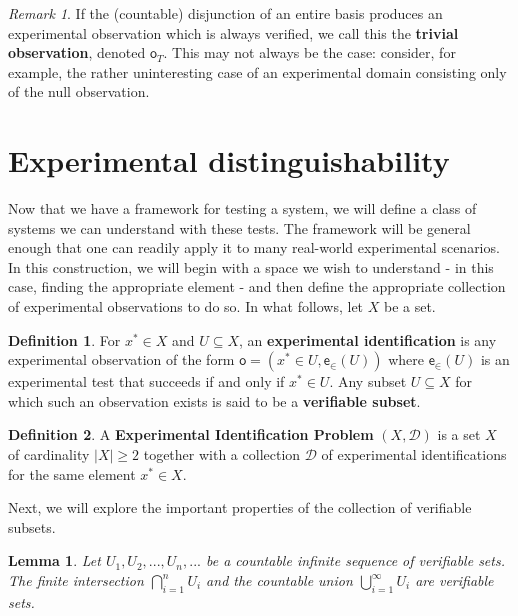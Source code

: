 \documentclass[review]{elsarticle}
\theoremstyle{plain}%
\newtheorem{lem}[thm]{Lemma}
\theoremstyle{definition}
\newtheorem{defn}{Definition}[section]
\theoremstyle{remark}
\newtheorem*{rem}{Remark}
\begin{document}
\begin{rem}
If the (countable) disjunction of an entire basis produces an experimental observation which is always verified, we call this the \textbf{trivial observation}, denoted $\mathsf{o}_T$. This may not always be the case: consider, for example, the rather uninteresting case of an experimental domain consisting only of the null observation. 
\end{rem}




\section{Experimental distinguishability}

Now that we have a framework for testing a system, we will define a class of systems we can understand with these tests. The framework will be general enough that one can readily apply it to many real-world experimental scenarios. In this construction, we will begin with a space we wish to understand - in this case, finding the appropriate element - and then define the appropriate collection of experimental observations to do so. In what follows, let $X$ be a set. 

\begin{defn}
For $x^*\in X$ and $U\subseteq X$, an \textbf{experimental identification} is any experimental observation of the form $\mathsf{o} = (x^*\in U, \mathsf{e}_\in(U))$ where $\mathsf{e}_\in(U)$ is an experimental test that succeeds if and only if $x^*\in U$. Any subset $U\subseteq X$ for which such an observation exists is said to be a \textbf{verifiable subset}. 
\end{defn} 


\begin{defn}
A \textbf{Experimental Identification Problem} $(X,\mathcal{D})$ is a set $X$ of cardinality $|X|\geq2$ together with a collection $\mathcal{D}$ of experimental identifications for the same element $x^*\in X$. 
\end{defn}

Next, we will explore the important properties of the collection of verifiable subsets. 


\begin{lem}
\label{setbehavior}
	Let $U_1, U_2, ... , U_n, ...$ be a countable infinite sequence of verifiable sets. The finite intersection $\bigcap\limits_{i=1}^{n} U_i$ and the countable union $\bigcup\limits_{i=1}^{\infty} U_i$ are verifiable sets.
\end{lem}
\end{document}
